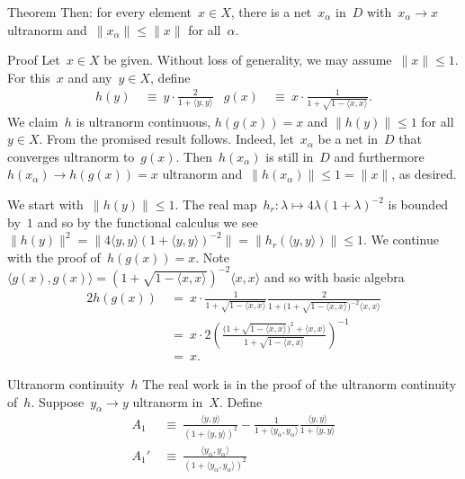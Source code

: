 \begin{parsec}
\begin{point}{Theorem}
Then: for every element~$x \in X$,
    there is a net~$x_\alpha$ in~$D$
    with~$x_\alpha \to x$ ultranorm
    and~$\|x_\alpha\| \leq \|x\|$ for all~$\alpha$.
\begin{point}{Proof}%
Let~$x \in X$ be given.
Without loss of generality, we may assume~$\| x \| \leq 1$.
For this~$x$ and any~$y \in X$, define
\begin{align*}
    h(y) &\ \equiv \ y \cdot\frac{2}{1+ \langle y, y \rangle}
    &
    g(x) &\ \equiv \ x \cdot\frac{1}{1+ \sqrt{1- \langle x, x\rangle}}.
\end{align*}
We claim~$h$ is ultranorm continuous,
$h(g(x)) = x$ and $\| h(y) \| \leq 1$ for all~$y \in X$.
From the promised result follows.
Indeed, let~$x_\alpha$ be a net in~$D$
    that converges ultranorm to~$g(x)$.
Then~$h(x_\alpha)$ is
    still in~$D$
    and furthermore~$h(x_\alpha) \to h(g(x)) = x$ ultranorm
    and~$\| h(x_\alpha) \| \leq 1 = \| x \|$, as desired.
\begin{point}%
We start with~$\| h(y) \| \leq 1$.
The real map~$h_r\colon \lambda \mapsto 4 \lambda (1+\lambda)^{-2}$
    is bounded by~$1$ and so by the functional calculus
    we see~$\| h(y) \|^2 = \| 4 \langle y,y\rangle (1+ \langle y,y\rangle)^{-2} \|
                = \| h_r(\langle y,y\rangle) \|  \leq 1$.
We continue with the proof of~$h(g(x)) = x$.
Note~$\langle g(x), g(x) \rangle
= (1 + \sqrt{1 - \langle x,x \rangle })^{-2} \langle x,x\rangle$
and so with basic algebra
\begin{alignat*}{2}
    h(g(x)) &\ = \ x \cdot
\frac{1}{ 1 + \sqrt{1 - \langle x,x\rangle }}
\frac{2}{1 + \bigl(1 + \sqrt{1 - \langle x,x \rangle }\bigr)^{-2} \langle x,x\rangle} \\
& \ =\  x \cdot 2 \left( \frac{
    \bigl(1 + \sqrt{1-\langle x, x\rangle}\bigr)^2 + \langle x,x \rangle
}{1 + \sqrt{1 - \langle x,x \rangle}} \right)^{-1} \\
& \ = \ x.
\end{alignat*}
\end{point}
\begin{point}{Ultranorm continuity~$h$}%
The real work is in the proof of the ultranorm continuity of~$h$.
Suppose~$y_\alpha \to y$ ultranorm in~$X$. Define
\begin{align*}
    A_1 & \ \equiv \ \frac{\langle y,y\rangle}{(1 + \langle y,y \rangle)^2} 
            - \frac{1}{1+\langle y_\alpha,y_\alpha \rangle} \frac{\langle y,y \rangle}{1+\langle y,y \rangle} \\
    A_1' & \ \equiv \ 
    \frac{\langle y_\alpha,y_\alpha\rangle}{(1 + \langle y_\alpha,y_\alpha \rangle)^2}  

\end{align*}
\end{point}
\end{point}
\end{point}
\end{parsec}
